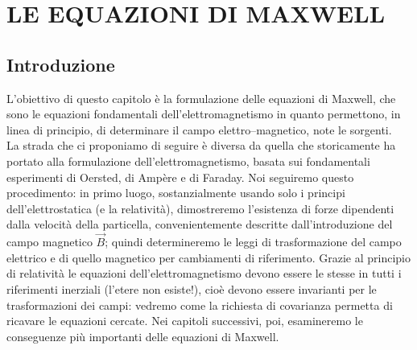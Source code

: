 \section{LE EQUAZIONI DI MAXWELL}

\subsection{Introduzione}

L'obiettivo di questo capitolo \`e la formulazione delle equazioni di Maxwell,
che sono le equazioni fondamentali dell'elettromagnetismo in quanto permettono,
in linea di principio, di determinare il campo elettro--magnetico, note le
sorgenti.\\
La strada che ci proponiamo di seguire \`e diversa da quella che storicamente ha
portato alla formulazione dell'elettromagnetismo, basata sui fondamentali
esperimenti di Oersted, di Amp\`ere e di Faraday. Noi seguiremo questo
procedimento: in primo luogo, sostanzialmente usando solo i principi
dell'elettrostatica (e la relativit\`a), dimostreremo l'esistenza di forze
dipendenti dalla velocit\`a della particella, convenientemente descritte
dall'introduzione del campo magnetico $\vec B$; quindi determineremo le leggi di
trasformazione del campo elettrico e di quello magnetico per cambiamenti di
riferimento. Grazie al principio di relativit\`a le equazioni
dell'elettromagnetismo devono essere le stesse in tutti i riferimenti inerziali
(l'etere non esiste!), cio\`e devono essere invarianti per le trasformazioni dei
campi: vedremo come la richiesta di covarianza permetta di ricavare le equazioni
cercate. Nei capitoli successivi, poi, esamineremo le conseguenze pi\`u
importanti delle equazioni di Maxwell.

